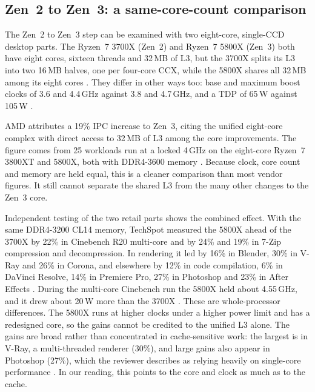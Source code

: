 \subsection{Zen~2 to Zen~3: a same-core-count comparison}
\label{sec:zen2-zen3}
The Zen~2 to Zen~3 step can be examined with two eight-core, single-CCD desktop parts. The Ryzen~7 3700X (Zen~2) and Ryzen~7 5800X (Zen~3) both have eight cores, sixteen threads and 32\,MB of L3, but the 3700X splits its L3 into two 16\,MB halves, one per four-core CCX, while the 5800X shares all 32\,MB among its eight cores \cite{suggs2019zen2,amd2022epyc7003}. They differ in other ways too: base and maximum boost clocks of 3.6 and 4.4\,GHz against 3.8 and 4.7\,GHz, and a TDP of 65\,W against 105\,W \cite{advancedmicrodevicesinc.AMDRyzen30002022}.

AMD attributes a 19\% IPC increase to Zen~3, citing the unified eight-core complex with direct access to 32\,MB of L3 among the core improvements. The figure comes from 25 workloads run at a locked 4\,GHz on the eight-core Ryzen~7 3800XT and 5800X, both with DDR4-3600 memory \cite[note~4]{advancedmicrodevicesinc.AMDLaunchesAMD2020}. Because clock, core count and memory are held equal, this is a cleaner comparison than most vendor figures. It still cannot separate the shared L3 from the many other changes to the Zen~3 core.

Independent testing of the two retail parts shows the combined effect. With the same DDR4-3200 CL14 memory, TechSpot measured the 5800X ahead of the 3700X by 22\% in Cinebench R20 multi-core and by 24\% and 19\% in 7-Zip compression and decompression. In rendering it led by 16\% in Blender, 30\% in V-Ray and 26\% in Corona, and elsewhere by 12\% in code compilation, 6\% in DaVinci Resolve, 14\% in Premiere Pro, 27\% in Photoshop and 23\% in After Effects \cite{waltonAMDRyzen72020}. During the multi-core Cinebench run the 5800X held about 4.55\,GHz, and it drew about 20\,W more than the 3700X \cite{waltonAMDRyzen72020}. These are whole-processor differences. The 5800X runs at higher clocks under a higher power limit and has a redesigned core, so the gains cannot be credited to the unified L3 alone. The gains are broad rather than concentrated in cache-sensitive work: the largest is in V-Ray, a multi-threaded renderer (30\%), and large gains also appear in Photoshop (27\%), which the reviewer describes as relying heavily on single-core performance \cite{waltonAMDRyzen72020}. In our reading, this points to the core and clock as much as to the cache.

